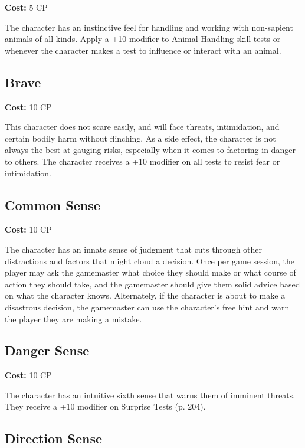 \textbf{Cost:} 5 CP 

The character has an instinctive feel for handling and working with non-sapient animals of all kinds. Apply a +10 modifier to Animal Handling skill tests or whenever the character makes a test to influence or interact with an animal. 

\subsection{Brave} \label{sec:traits-brave} 

\textbf{Cost:} 10 CP 

This character does not scare easily, and will face threats, intimidation, and certain bodily harm without flinching. As a side effect, the character is not always the best at gauging risks, especially when it comes to factoring in danger to others. The character receives a +10 modifier on all tests to resist fear or intimidation. 

\subsection{Common Sense} \label{sec:traits-common-sense} 

\textbf{Cost:} 10 CP 

The character has an innate sense of judgment that cuts through other distractions and factors that might cloud a decision. Once per game session, the player may ask the gamemaster what choice they should make or what course of action they should take, and the gamemaster should give them solid advice based on what the character knows. Alternately, if the character is about to make a disastrous decision, the gamemaster can use the character’s free hint and warn the player they are making a mistake. 

\subsection{Danger Sense} \label{sec:traits-danger-sense} 

\textbf{Cost:} 10 CP 

The character has an intuitive sixth sense that warns them of imminent threats. They receive a +10 modifier on Surprise Tests (p. 204). 

\subsection{Direction Sense} \label{sec:traits-direction-sense} 

